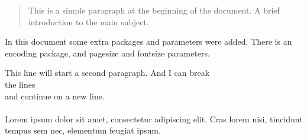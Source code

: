 \documentclass[12pt, letterpaper, twoside]{article}
\begin{document}
\begin{abstract}
This is a simple paragraph at the beginning of the document. A brief introduction to the main subject.
\end{abstract}

In this document some extra packages and parameters
were added. There is an encoding package,
and pagesize and fontsize parameters.

This line will start a second paragraph. And I can
 break\\ the lines \\ and continue on a new line.
 
 \paragraph{}
Lorem ipsum dolor sit amet, consectetur adipiscing elit. Cras lorem nisi, tincidunt tempus sem nec, elementum feugiat ipsum. 
\end{document}
